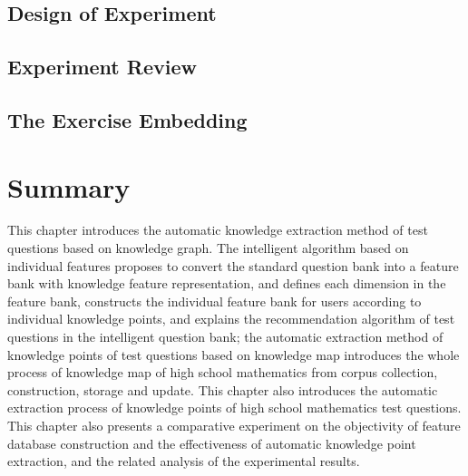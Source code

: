 \subsection{Design of Experiment}

\subsection{Experiment Review}


\subsection{The Exercise Embedding }

\section{Summary}
This chapter introduces the automatic knowledge extraction method of test questions based on knowledge graph. The intelligent algorithm based on individual features proposes to convert the standard question bank into a feature bank with knowledge feature representation, and defines each dimension in the feature bank, constructs the individual feature bank for users according to individual knowledge points, and explains the recommendation algorithm of test questions in the intelligent question bank; the automatic extraction method of knowledge points of test questions based on knowledge map introduces the whole process of knowledge map of high school mathematics from corpus collection, construction, storage and update. This chapter also introduces the automatic extraction process of knowledge points of high school mathematics test questions. This chapter also presents a comparative experiment on the objectivity of feature database construction and the effectiveness of automatic knowledge point extraction, and the related analysis of the experimental results.